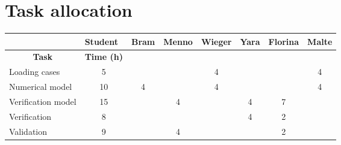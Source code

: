 \section{Task allocation}
\begin{center}
    

\begin{table}[H]
\centering
\begin{tabular}{l|c|c|c|c|c|c|c|}

\cline{2-8}
\textbf{}                                  & \multicolumn{1}{l|}{\textbf{Student}} & \multicolumn{1}{l|}{Bram} & \multicolumn{1}{l|}{Menno} & \multicolumn{1}{l|}{Wieger} & \multicolumn{1}{l|}{Yara} & \multicolumn{1}{l|}{Florina} & \multicolumn{1}{l|}{Malte} \\ \hline
\multicolumn{1}{|c|}{\textbf{Task}}        & \textbf{Time (h)}                     &                           &                            &                             &                           &                              &                            \\ \hline
\multicolumn{1}{|l|}{Loading cases}        & 5                                     &                           &                            & 4                           &                           &                              & 4                          \\ \hline
\multicolumn{1}{|l|}{Numerical model}      & 10                                    & 4                         &                            & 4                           &                           &                              & 4                          \\ \hline
\multicolumn{1}{|l|}{Verification model}   & 15                                    &                           & 4                          &                             & 4                         & 7                            &                            \\ \hline
\multicolumn{1}{|l|}{Verification}         & 8                                     &                           &                            &                             & 4                         & 2                            &                            \\ \hline
\multicolumn{1}{|l|}{Validation}           & 9                                     &                           & 4                          &                             &                           & 2                            &                            \\ \hline

\end{tabular}
\end{table}
\end{center}
